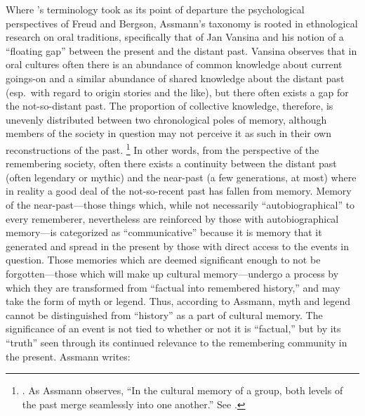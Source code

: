 Where \halbwachs's terminology took as its point of departure the psychological perspectives of Freud%
    \autocite{terdiman_radstone-schwarz2011}
and Bergson,%
    \autocite{ansellpearson_radstone-schwarz2011}
Assmann's taxonomy is rooted in ethnological research on oral traditions, specifically that of Jan Vansina and his notion of a ``floating gap'' between the present and the distant past.%
    \autocite{vansina1985}
Vansina observes that in oral cultures often there is an abundance of common knowledge about current goings-on and a similar abundance of shared knowledge about the distant past (esp.~with regard to origin stories and the like), but there often exists a gap for the not-so-distant past. The proportion of collective knowledge, therefore, is unevenly distributed between two chronological poles of memory, although members of the society in question may not perceive it as such in their own reconstructions of the past.%
    \footnote{%
        \Cite[23--24]{vansina1985}. 
        As Assmann observes, ``In the cultural memory of a group, both levels of the past merge seamlessly into one another.'' See 
        \cite[35]{assmann2011}.}
In other words, from the perspective of the remembering society, often there exists a continuity between the distant past (often legendary or mythic) and the near-past (a few generations, at most) where in reality a good deal of the not-so-recent past has fallen from memory. Memory of the near-past---those things which, while not necessarily ``autobiographical'' to every rememberer, nevertheless are reinforced by those with autobiographical memory---is categorized as ``communicative'' because it is memory that it generated and spread in the present by those with direct access to the events in question. Those memories which are deemed significant enough to not be forgotten---those which will make up cultural memory---undergo a process by which they are transformed from ``factual into remembered history,'' and may take the form of myth or legend.%
    \autocite[37--38]{assmann2011}
Thus, according to Assmann, myth and legend cannot be distinguished from ``history'' as a part of cultural memory. The significance of an event is not tied to whether or not it is ``factual,'' but by its ``truth'' seen through its continued relevance to the remembering community in the present.%
    \autocite[Paul Veyne offers a particularly stimulating discussion of the perception of the past and its relationship to myth. He concludes his book with the insightful quote, ``The theme of this book was very simple. Merely by reading the title, anyone with the slightest historical background would immediately have answered, `but of course they believed in their myths!' We have simply wanted also to make clear that what is true of `them' is also true of ourselves and to bring out the implications of this primary truth.''][128--129]{veyne1988}
Assmann writes:  

